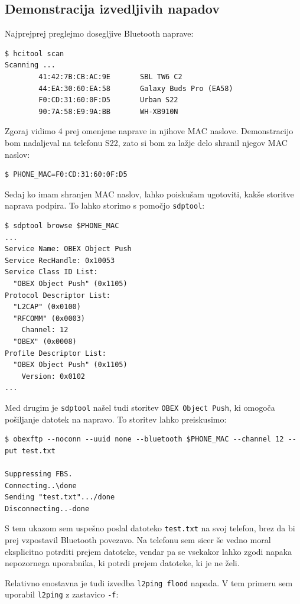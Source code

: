 \documentclass[11pt,a4paper,slovene]{article}
\begin{document}
\subsection{Demonstracija izvedljivih napadov}

Najprejprej preglejmo dosegljive Bluetooth naprave:
\begin{verbatim}
$ hcitool scan
Scanning ...
        41:42:7B:CB:AC:9E       SBL TW6 C2
        44:EA:30:60:EA:58       Galaxy Buds Pro (EA58)
        F0:CD:31:60:0F:D5       Urban S22
        90:7A:58:E9:9A:BB       WH-XB910N
\end{verbatim}

Zgoraj vidimo 4 prej omenjene naprave in njihove MAC naslove. Demonstracijo bom nadaljeval na telefonu S22, zato si bom za lažje delo shranil njegov MAC naslov:

\begin{verbatim}
$ PHONE_MAC=F0:CD:31:60:0F:D5
\end{verbatim}

Sedaj ko imam shranjen MAC naslov, lahko poiskušam ugotoviti, kakše storitve naprava podpira. To lahko storimo s pomočjo \texttt{sdptool}:
\begin{verbatim}
$ sdptool browse $PHONE_MAC
...
Service Name: OBEX Object Push
Service RecHandle: 0x10053
Service Class ID List:
  "OBEX Object Push" (0x1105)
Protocol Descriptor List:
  "L2CAP" (0x0100)
  "RFCOMM" (0x0003)
    Channel: 12
  "OBEX" (0x0008)
Profile Descriptor List:
  "OBEX Object Push" (0x1105)
    Version: 0x0102
...
\end{verbatim}

Med drugim je \texttt{sdptool} našel tudi storitev \texttt{OBEX Object Push}, ki omogoča pošiljanje datotek na napravo. To storitev lahko preiskusimo:

\begin{verbatim}
$ obexftp --noconn --uuid none --bluetooth $PHONE_MAC --channel 12 --put test.txt

Suppressing FBS.
Connecting..\done
Sending "test.txt".../done
Disconnecting..-done    
\end{verbatim}

S tem ukazom sem uspešno poslal datoteko \texttt{test.txt} na svoj telefon, brez da bi prej vzpostavil Bluetooth povezavo. Na telefonu sem sicer še vedno moral eksplicitno potrditi prejem datoteke, vendar pa se vsekakor lahko zgodi napaka nepozornega uporabnika, ki potrdi prejem datoteke, ki je ne želi.

Relativno enostavna je tudi izvedba \texttt{l2ping flood} napada. V tem primeru sem uporabil \texttt{l2ping} z zastavico \texttt{-f}:
\end{document}
